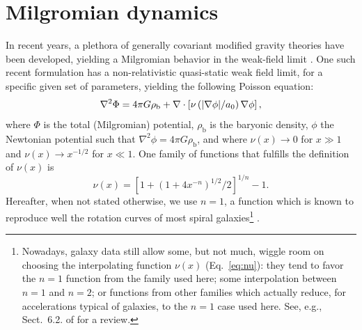 \documentclass[useAMS,usenatbib]{mn2e}
\newcommand{\PhiN}{\phi}
\newcommand{\grad}{{\bf \nabla}}
\begin{document}
\section{Milgromian dynamics}\label{sect:mond}
In recent years, a plethora of generally covariant modified gravity theories have been developed, yielding a Milgromian behavior in the weak-field limit \citep{FamMcgaugh}.  One such recent formulation \citep{BIMOND} has a non-relativistic quasi-static weak field limit, for a specific given set of parameters, yielding the following Poisson equation:
\begin{equation}
\nabla^2 \Phi=4 \pi G \rho_\text{b} + \nabla \cdot \left[ \nu\left(|{\mathbf\grad} \PhiN|/a_0\right) {\mathbf\grad} \PhiN \right],
\label{pois}
\end{equation}
where $\Phi$ is the total (Milgromian) potential, 
$\rho_\text{b}$ is the baryonic density, 
$\PhiN$ the Newtonian potential such that $\nabla^2 \PhiN=4 \pi G \rho_\text{b}$, and where $\nu(x) \rightarrow 0$ for $x \gg 1$ and $\nu(x) \rightarrow x^{-1/2}$ for $x \ll 1$.
One family of functions that fulfills the definition of $\nu(x)$ \citep[see, e.g.][]{FamMcgaugh} is
\begin{equation}
\nu(x)=\left[{1+(1+4x^{-n})^{1/2} / 2}   \right]^{1/n} -1 .
\label{eq:nu}
\end{equation}
Hereafter, when not stated otherwise, we use $n=1$, a function which is known to reproduce well the rotation curves of most spiral galaxies\footnote{Nowadays, galaxy data still allow some, but not much, wiggle room on choosing the interpolating function $\nu(x)$ (Eq.~\ref{eq:nu}): they tend to favor the $n=1$ function from the family used here; some interpolation between $n=1$ and $n=2$; or functions from other families which actually reduce, for accelerations typical of galaxies, to the $n=1$ case used here. See, e.g., Sect.~6.2. of \citet{FamMcgaugh} for a review.} \citep{things}.
\end{document}
